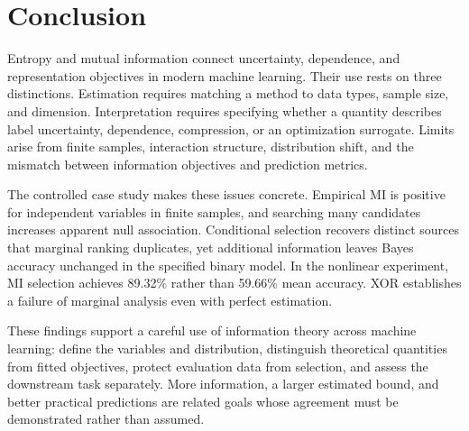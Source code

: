 \documentclass[journal,11pt]{IEEEtran}
\begin{document}
\section{Conclusion}
Entropy and mutual information connect uncertainty, dependence, and representation objectives in modern machine learning. Their use rests on three distinctions. Estimation requires matching a method to data types, sample size, and dimension. Interpretation requires specifying whether a quantity describes label uncertainty, dependence, compression, or an optimization surrogate. Limits arise from finite samples, interaction structure, distribution shift, and the mismatch between information objectives and prediction metrics.

The controlled case study makes these issues concrete. Empirical MI is positive for independent variables in finite samples, and searching many candidates increases apparent null association. Conditional selection recovers distinct sources that marginal ranking duplicates, yet additional information leaves Bayes accuracy unchanged in the specified binary model. In the nonlinear experiment, MI selection achieves 89.32\% rather than 59.66\% mean accuracy. XOR establishes a failure of marginal analysis even with perfect estimation.

These findings support a careful use of information theory across machine learning: define the variables and distribution, distinguish theoretical quantities from fitted objectives, protect evaluation data from selection, and assess the downstream task separately. More information, a larger estimated bound, and better practical predictions are related goals whose agreement must be demonstrated rather than assumed.
\end{document}
